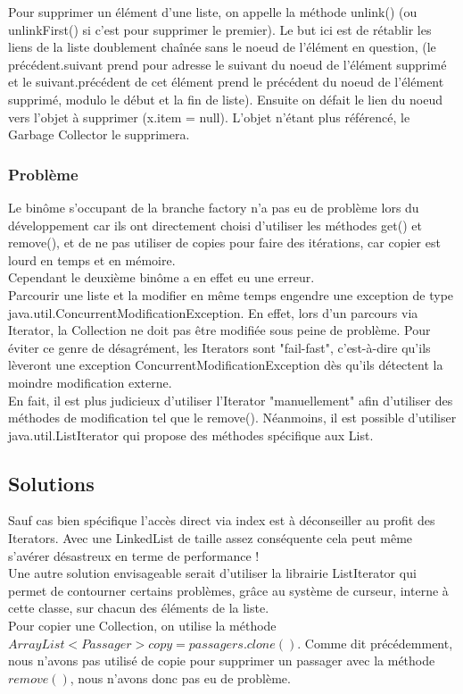 \documentclass[a4paper,11pt]{article}
\begin{document}
Pour supprimer un élément d'une liste, on appelle la méthode unlink() (ou unlinkFirst() si c'est pour supprimer le premier). Le but ici est de rétablir les liens de la liste doublement chaînée sans le noeud de l'élément en question, (le précédent.suivant prend pour adresse le suivant du noeud de l'élément supprimé et le suivant.précédent de cet élément prend le précédent du noeud de l'élément supprimé, modulo le début et la fin de liste). Ensuite on défait le lien du noeud vers l'objet à supprimer (x.item = null). L'objet n'étant plus référencé, le Garbage Collector le supprimera.

\subsubsection{Problème}
Le binôme s'occupant de la branche factory n'a pas eu de problème lors du développement car ils ont directement choisi d'utiliser les méthodes get() et remove(), et de ne pas utiliser de copies pour faire des itérations, car copier est lourd en temps et en mémoire.\\
Cependant le deuxième binôme a en effet eu une erreur.\\
Parcourir une liste et la modifier en même temps engendre une exception de type java.util.ConcurrentModificationException. En effet, lors d'un parcours via Iterator, la Collection ne doit pas être modifiée sous peine de problème. Pour éviter ce genre de désagrément, les Iterators sont "fail-fast", c'est-à-dire qu'ils lèveront une exception ConcurrentModificationException dès qu'ils détectent la moindre modification externe.\\
En fait, il est plus judicieux d'utiliser l'Iterator "manuellement" afin d'utiliser des méthodes de modification tel que le remove(). Néanmoins, il est possible d'utiliser java.util.ListIterator qui propose des méthodes spécifique aux List.

\subsection{Solutions}
Sauf cas bien spécifique l'accès direct via index est à déconseiller au profit des Iterators. Avec une LinkedList de taille assez conséquente cela peut même s'avérer désastreux en terme de performance !\\
Une autre solution envisageable serait d'utiliser la librairie ListIterator qui permet de contourner certains problèmes, grâce au système de curseur, interne à cette classe, sur chacun des éléments de la liste.\\
Pour copier une Collection, on utilise la méthode $ArrayList<Passager> copy = passagers.clone()$. Comme dit précédemment, nous n'avons pas utilisé de copie pour supprimer un passager avec la méthode $remove()$, nous n'avons donc pas eu de problème.
\end{document}
